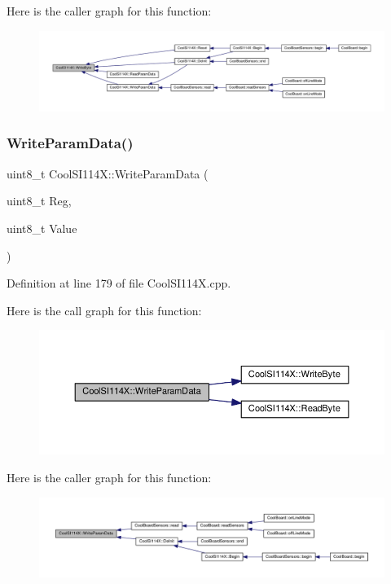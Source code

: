 Here is the caller graph for this function\+:\nopagebreak
\begin{figure}[H]
\begin{center}
\leavevmode
\includegraphics[width=350pt]{class_cool_s_i114_x_ac5c8dc5ade604da7a1c8cd1586feefc2_icgraph}
\end{center}
\end{figure}
\mbox{\label{class_cool_s_i114_x_abf45eb10a6de1be16e68a51624fa2608}} 
\subsubsection{\texorpdfstring{Write\+Param\+Data()}{WriteParamData()}}
{\footnotesize\ttfamily uint8\+\_\+t Cool\+S\+I114\+X\+::\+Write\+Param\+Data (\begin{DoxyParamCaption}\item[{uint8\+\_\+t}]{Reg,  }\item[{uint8\+\_\+t}]{Value }\end{DoxyParamCaption})}



Definition at line 179 of file Cool\+S\+I114\+X.\+cpp.

Here is the call graph for this function\+:\nopagebreak
\begin{figure}[H]
\begin{center}
\leavevmode
\includegraphics[width=350pt]{class_cool_s_i114_x_abf45eb10a6de1be16e68a51624fa2608_cgraph}
\end{center}
\end{figure}
Here is the caller graph for this function\+:\nopagebreak
\begin{figure}[H]
\begin{center}
\leavevmode
\includegraphics[width=350pt]{class_cool_s_i114_x_abf45eb10a6de1be16e68a51624fa2608_icgraph}
\end{center}
\end{figure}


